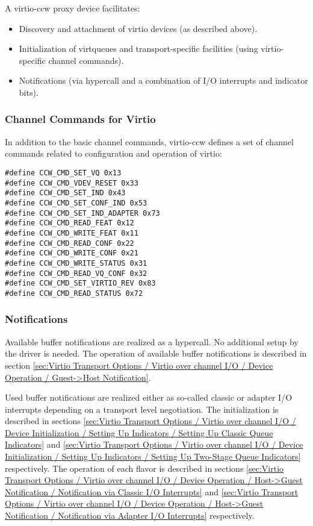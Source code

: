 A virtio-ccw proxy device facilitates:
\begin{itemize} 
\item Discovery and attachment of virtio devices (as described above).
\item Initialization of virtqueues and transport-specific facilities (using
      virtio-specific channel commands).
\item Notifications (via hypercall and a combination of I/O interrupts
      and indicator bits).
\end{itemize} 

\subsubsection{Channel Commands for Virtio}\label{sec:Virtio Transport Options / Virtio
over channel I/O / Basic Concepts/ Channel Commands for Virtio}

In addition to the basic channel commands, virtio-ccw defines a
set of channel commands related to configuration and operation of
virtio:

\begin{lstlisting}
#define CCW_CMD_SET_VQ 0x13
#define CCW_CMD_VDEV_RESET 0x33
#define CCW_CMD_SET_IND 0x43
#define CCW_CMD_SET_CONF_IND 0x53
#define CCW_CMD_SET_IND_ADAPTER 0x73
#define CCW_CMD_READ_FEAT 0x12
#define CCW_CMD_WRITE_FEAT 0x11
#define CCW_CMD_READ_CONF 0x22
#define CCW_CMD_WRITE_CONF 0x21
#define CCW_CMD_WRITE_STATUS 0x31
#define CCW_CMD_READ_VQ_CONF 0x32
#define CCW_CMD_SET_VIRTIO_REV 0x83
#define CCW_CMD_READ_STATUS 0x72
\end{lstlisting}

\subsubsection{Notifications}\label{sec:Virtio Transport Options / Virtio
over channel I/O / Basic Concepts/ Notifications}

Available buffer notifications are realized as a hypercall. No additional
setup by the driver is needed. The operation of available buffer
notifications is described in section \ref{sec:Virtio Transport Options /
Virtio over channel I/O / Device Operation / Guest->Host Notification}.

Used buffer notifications are realized either as so-called classic or
adapter I/O interrupts depending on a transport level negotiation. The
initialization is described in sections \ref{sec:Virtio Transport Options
/ Virtio over channel I/O / Device Initialization / Setting Up Indicators
/ Setting Up Classic Queue Indicators} and \ref{sec:Virtio Transport
Options / Virtio over channel I/O / Device Initialization / Setting Up
Indicators / Setting Up Two-Stage Queue Indicators} respectively.  The
operation of each flavor is described in sections \ref{sec:Virtio
Transport Options / Virtio over channel I/O / Device Operation /
Host->Guest Notification / Notification via Classic I/O Interrupts} and
\ref{sec:Virtio Transport Options / Virtio over channel I/O / Device
Operation / Host->Guest Notification / Notification via Adapter I/O
Interrupts} respectively. 

